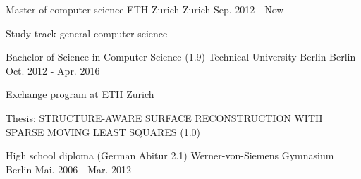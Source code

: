 

\begin{cventries}

  \cventry
    {Master of computer science} %
    {ETH Zurich} %
    {Zurich} %
    {Sep. 2012 - Now} %
    {
      \begin{cvitems} %
        \item {Study track general computer science}
      \end{cvitems}
    }


  \cventry
    {Bachelor of Science in Computer Science (1.9)} %
    {Technical University Berlin} %
    {Berlin} %
    {Oct. 2012 - Apr. 2016} %
    {
      \begin{cvitems} %
        \item {Exchange program at ETH Zurich}
        \item {Thesis: STRUCTURE-AWARE SURFACE RECONSTRUCTION WITH SPARSE MOVING LEAST SQUARES (1.0)}
      \end{cvitems}
    }


  \cventry
    {High school diploma (German Abitur 2.1)} %
    {Werner-von-Siemens Gymnasium} %
    {Berlin} %
    {Mai. 2006 - Mar. 2012} %
    {}

\end{cventries}
